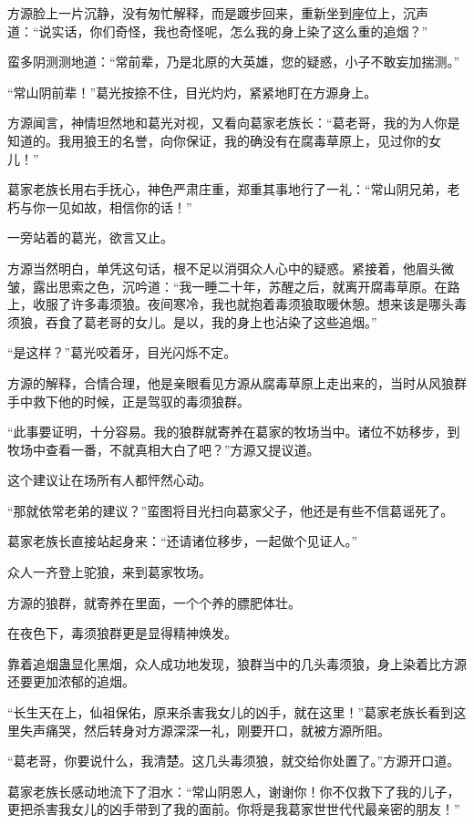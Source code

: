 \begin{this_body}
方源脸上一片沉静，没有匆忙解释，而是踱步回来，重新坐到座位上，沉声道：“说实话，你们奇怪，我也奇怪呢，怎么我的身上染了这么重的追烟？”

蛮多阴测测地道：“常前辈，乃是北原的大英雄，您的疑惑，小子不敢妄加揣测。”

“常山阴前辈！”葛光按捺不住，目光灼灼，紧紧地盯在方源身上。

方源闻言，神情坦然地和葛光对视，又看向葛家老族长：“葛老哥，我的为人你是知道的。我用狼王的名誉，向你保证，我的确没有在腐毒草原上，见过你的女儿！”

葛家老族长用右手抚心，神色严肃庄重，郑重其事地行了一礼：“常山阴兄弟，老朽与你一见如故，相信你的话！”

一旁站着的葛光，欲言又止。

方源当然明白，单凭这句话，根不足以消弭众人心中的疑惑。紧接着，他眉头微皱，露出思索之色，沉吟道：“我一睡二十年，苏醒之后，就离开腐毒草原。在路上，收服了许多毒须狼。夜间寒冷，我也就抱着毒须狼取暖休憩。想来该是哪头毒须狼，吞食了葛老哥的女儿。是以，我的身上也沾染了这些追烟。”

“是这样？”葛光咬着牙，目光闪烁不定。

方源的解释，合情合理，他是亲眼看见方源从腐毒草原上走出来的，当时从风狼群手中救下他的时候，正是驾驭的毒须狼群。

“此事要证明，十分容易。我的狼群就寄养在葛家的牧场当中。诸位不妨移步，到牧场中查看一番，不就真相大白了吧？”方源又提议道。

这个建议让在场所有人都怦然心动。

“那就依常老弟的建议？”蛮图将目光扫向葛家父子，他还是有些不信葛谣死了。

葛家老族长直接站起身来：“还请诸位移步，一起做个见证人。”

众人一齐登上驼狼，来到葛家牧场。

方源的狼群，就寄养在里面，一个个养的膘肥体壮。

在夜色下，毒须狼群更是显得精神焕发。

靠着追烟蛊显化黑烟，众人成功地发现，狼群当中的几头毒须狼，身上染着比方源还要更加浓郁的追烟。

“长生天在上，仙祖保佑，原来杀害我女儿的凶手，就在这里！”葛家老族长看到这里失声痛哭，然后转身对方源深深一礼，刚要开口，就被方源所阻。

“葛老哥，你要说什么，我清楚。这几头毒须狼，就交给你处置了。”方源开口道。

葛家老族长感动地流下了泪水：“常山阴恩人，谢谢你！你不仅救下了我的儿子，更把杀害我女儿的凶手带到了我的面前。你将是我葛家世世代代最亲密的朋友！”


\end{this_body}
